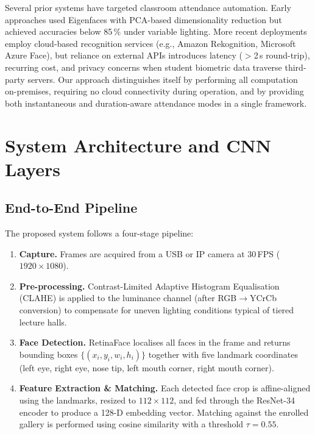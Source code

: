 \documentclass[conference, 10pt]{IEEEtran}
\begin{document}
Several prior systems have targeted classroom attendance automation.  Early approaches used
Eigenfaces with PCA-based dimensionality reduction but achieved accuracies below 85\,\% under
variable lighting.  More recent deployments employ cloud-based recognition services (e.g.,
Amazon Rekognition, Microsoft Azure Face), but reliance on external APIs introduces latency
($>$2\,s round-trip), recurring cost, and privacy concerns when student biometric data
traverse third-party servers.  Our approach distinguishes itself by performing all computation
on-premises, requiring no cloud connectivity during operation, and by providing both
instantaneous and duration-aware attendance modes in a single framework.


\section{System Architecture and CNN Layers}
\label{sec:arch}

\subsection{End-to-End Pipeline}

The proposed system follows a four-stage pipeline:

\begin{enumerate}
    \item \textbf{Capture.}  Frames are acquired from a USB or IP camera at 30\,FPS
          ($1920 \times 1080$).
    \item \textbf{Pre-processing.}  Contrast-Limited Adaptive Histogram Equalisation (CLAHE)
          is applied to the luminance channel (after RGB$\to$YCrCb conversion) to compensate
          for uneven lighting conditions typical of tiered lecture halls.
    \item \textbf{Face Detection.}  RetinaFace localises all faces in the frame and returns
          bounding boxes $\{(x_i, y_i, w_i, h_i)\}$ together with five landmark coordinates
          (left eye, right eye, nose tip, left mouth corner, right mouth corner).
    \item \textbf{Feature Extraction \& Matching.}  Each detected face crop is
          affine-aligned using the landmarks, resized to $112 \times 112$, and fed through the
          ResNet-34 encoder to produce a 128-D embedding vector.  Matching against the enrolled
          gallery is performed using cosine similarity with a threshold $\tau = 0.55$.
\end{enumerate}
\end{document}
